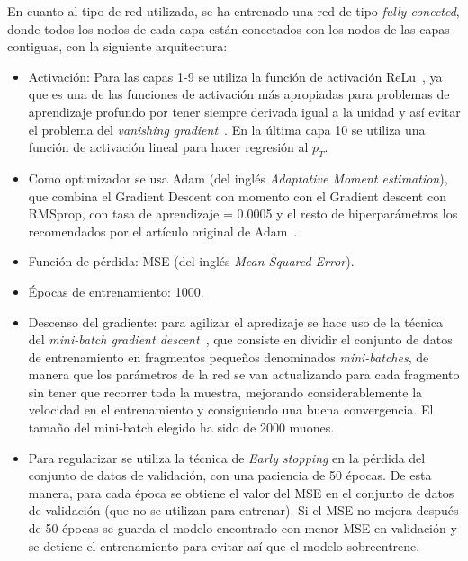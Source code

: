 En cuanto al tipo de red utilizada, se ha entrenado una red de tipo \textit{fully-conected}, donde todos los nodos de cada capa est\'an conectados con los nodos de las capas contiguas, con la siguiente arquitectura:


\begin{itemize}

\item Activaci\'on: Para las capas 1-9 se utiliza la funci\'on de activaci\'on ReLu~\cite{agarap2018deep}, ya que es una de las funciones de activaci\'on m\'as apropiadas para problemas de aprendizaje profundo por tener siempre derivada igual a la unidad y as\'i evitar el problema del \textit{vanishing gradient}~\cite{Hochreiter:91}. En la \'ultima capa 10 se utiliza una funci\'on de activaci\'on lineal para hacer regresi\'on al $p_{T}$.

\item Como optimizador se usa Adam (del ingl\'es \textit{Adaptative Moment estimation}), que combina el Gradient Descent con momento con el Gradient descent con RMSprop, con tasa de aprendizaje = 0.0005 y el resto de hiperpar\'ametros los recomendados por el art\'iculo original de Adam~\cite{Kingma2015AdamAM}.

\item Funci\'on de p\'erdida: MSE (del ingl\'es \textit{Mean Squared Error}).

\item \'Epocas de entrenamiento: 1000.

\item Descenso del gradiente: para agilizar el apredizaje se hace uso de la t\'ecnica del \textit{mini-batch gradient descent}~\cite{perrone2019optimal}, que consiste en dividir el conjunto de datos de entrenamiento en fragmentos peque\~nos denominados \textit{mini-batches}, de manera que los par\'ametros de la red se van actualizando para cada fragmento sin tener que recorrer toda la muestra, mejorando considerablemente la velocidad en el entrenamiento y consiguiendo una buena convergencia. El tama\~no del mini-batch elegido ha sido de 2000 muones.

\item Para regularizar se utiliza la t\'ecnica de \textit{Early stopping} en la p\'erdida del conjunto de datos de validaci\'on, con una paciencia de 50 \'epocas. De esta manera, para cada \'epoca se obtiene el valor del MSE en el conjunto de datos de validaci\'on (que no se utilizan para entrenar). Si el MSE no mejora despu\'es de 50 \'epocas se guarda el modelo encontrado con menor MSE en validaci\'on y se detiene el entrenamiento para evitar as\'i que el modelo sobreentrene. 

\end{itemize}

